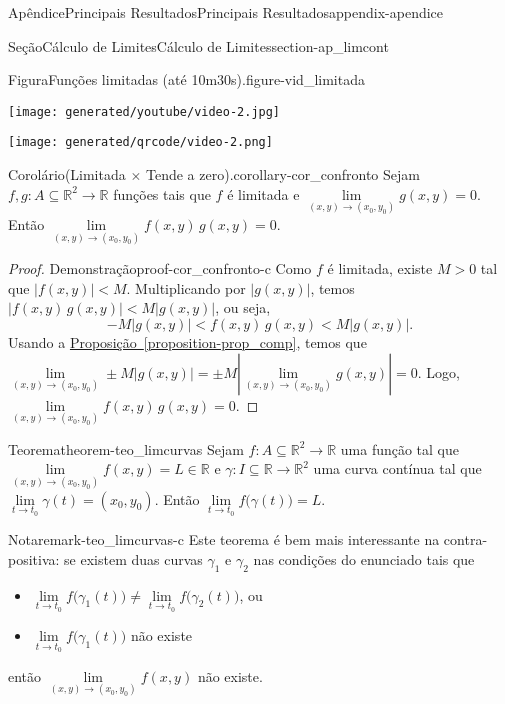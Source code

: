 \documentclass[oneside,10pt,]{book}
\newcommand{\xreffont}{\relax}
\numberwithin{equation}{section}
\newcommand{\R}{\mathbb R}
\begin{document}
\begin{appendixptx}{Apêndice}{Principais Resultados}{}{Principais Resultados}{}{}{appendix-apendice}
\begin{sectionptx}{Seção}{Cálculo de Limites}{}{Cálculo de Limites}{}{}{section-ap_limcont}
\begin{figureptx}{Figura}{Funções limitadas (até 10m30s).}{figure-vid_limitada}{}
\begin{sidebyside}{2}{0.075}{0.075}{0.17}
\begin{sbspanel}{0.47}%
\texttt{[image: generated/youtube/video-2.jpg]}
\end{sbspanel}%
\begin{sbspanel}{0.21}%
\texttt{[image: generated/qrcode/video-2.png]}
\end{sbspanel}%
\end{sidebyside}%
\tcblower
\end{figureptx}%
\begin{corollary}{Corolário}{(Limitada \(\times\) Tende a zero).}{}{corollary-cor_confronto}%
Sejam \(f,g\colon A\subseteq\R^2\to\R\) funções tais que \(f\) é limitada e \(\lim\limits_{(x,y)\to(x_0,y_0)}
g(x,y)=0\). Então \(\lim\limits_{(x,y)\to(x_0,y_0)}
f(x,y)\, g(x,y)=0\).%
\end{corollary}
\begin{proof}{Demonstração}{}{proof-cor_confronto-c}
Como \(f\) é limitada, existe \(M> 0\) tal que \(|f(x,y)|< M\). Multiplicando por \(|g(x,y)|\), temos \(|f(x,y)\, g(x,y)|< M|g(x,y)|\), ou seja,%
\begin{equation*}
-M|g(x,y)|< f(x,y)\, g(x,y)< M|g(x,y)|\text{.}
\end{equation*}
Usando a \hyperref[proposition-prop_comp]{Proposição~{\xreffont\ref{proposition-prop_comp}}}, temos que \(\lim\limits_{(x,y)\to(x_0,y_0)} \pm M|g(x,y)|=\pm
M|\lim\limits_{(x,y)\to(x_0,y_0)} g(x,y)|=0\). Logo, \(\lim\limits_{(x,y)\to(x_0,y_0)} f(x,y)\, g(x,y)=0\).%
\end{proof}
\begin{theorem}{Teorema}{}{}{theorem-teo_limcurvas}%
Sejam \(f\colon A\subseteq\R^2\to\R\) uma função tal que \(\lim\limits_{(x,y)\to(x_0,y_0)} f(x,y)=L\in\R\) e \(\gamma\colon I\subseteq\R\to\R^2\) uma curva contínua tal que \(\lim\limits_{t\to t_0}\gamma(t)=(x_0,y_0)\). Então \(\lim\limits_{t\to t_0} f\big(\gamma(t)\big)=L\).%
\begin{remark}{Nota}{}{remark-teo_limcurvas-c}%
Este teorema é bem mais interessante na contra-positiva: se existem duas curvas \(\gamma_1\) e \(\gamma_2\) nas condições do enunciado tais que %
\begin{itemize}[label=\textbullet]
\item{}\(\lim\limits_{t\to t_0}
f\big(\gamma_1(t)\big)\neq\lim\limits_{t\to t_0}
f\big(\gamma_2(t)\big)\), ou%
\item{}\(\lim\limits_{t\to t_0}
f\big(\gamma_1(t)\big)\) não existe%
\end{itemize}
 então \(\lim\limits_{(x,y)\to(x_0,y_0)} f(x,y)\) não existe.\end{remark}

\end{theorem}
\end{sectionptx}
\end{appendixptx}
\end{document}
